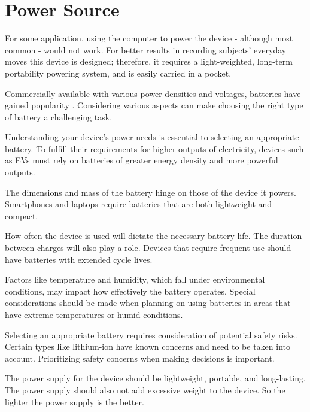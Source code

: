 %
%
%



\chapter{Power Source}

For some application, using the computer to power the device - although most common - would not work. For better results in recording subjects' everyday moves this device is designed; therefore, it requires a light-weighted, long-term portability powering system, and is easily carried in a pocket.

Commercially available with various power densities and voltages, batteries have gained popularity \cite{Dewan:2014}. Considering various aspects can make choosing the right type of battery a challenging task.

Understanding your device's power needs is essential to selecting an appropriate battery. To fulfill their requirements for higher outputs of electricity, devices such as EVs must rely on batteries of greater energy density and more powerful outputs.

The dimensions and mass of the battery hinge on those of the device it powers. Smartphones and laptops require batteries that are both lightweight and compact.

How often the device is used will dictate the necessary battery life. The duration between charges will also play a role. Devices that require frequent use should have batteries with extended cycle lives.

Factors like temperature and humidity, which fall under environmental conditions, may impact how effectively the battery operates. Special considerations should be made when planning on using batteries in areas that have extreme temperatures or humid conditions.

Selecting an appropriate battery requires consideration of potential safety risks. Certain types like lithium-ion have known concerns and need to be taken into account. Prioritizing safety concerns when making decisions is important.

The power supply for the device should be lightweight, portable, and long-lasting.
The power supply should also not add excessive weight to the device. So the lighter the power supply is the better. \cite{Scherer:2022}

